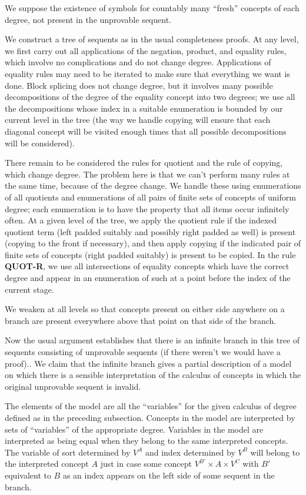 \documentclass{article}
\begin{document}
We suppose the existence of symbols for countably many ``fresh''
concepts of each degree, not present in the unprovable sequent.

We construct a tree of sequents as in the usual completeness proofs.
At any level, we first carry out all applications of the negation,
product, and equality rules, which involve no complications and do not
change degree.  Applications of equality rules may need to be iterated
to make sure that everything we want is done.  Block splicing does not
change degree, but it involves many possible decompositions of the
degree of the equality concept into two degrees; we use all the
decompositions whose index in a suitable enumeration is bounded by our
current level in the tree (the way we handle copying will ensure that
each diagonal concept will be visited enough times that all possible
decompositions will be considered).

There remain to be considered the rules for quotient and the rule of
copying, which change degree.  The problem here is that we can't
perform many rules at the same time, because of the degree change.  We
handle these using enumerations of all quotients and enumerations of
all pairs of finite sets of concepts of uniform degree; each
enumeration is to have the property that all items occur infinitely
often.  At a given level of the tree, we apply the quotient rule if
the indexed quotient term (left padded suitably and possibly right
padded as well) is present (copying to the front if necessary), and
then apply copying if the indicated pair of finite sets of concepts
(right padded suitably) is present to be copied.  In the rule {\bf
QUOT-R}, we use all intersections of equality concepts which have the
correct degree and appear in an enumeration of such at a point before
the index of the current stage.

We weaken at all levels so that concepts present on either side
anywhere on a branch are present everywhere above that point on that
side of the branch.

Now the usual argument establishes that there is an infinite branch in
this tree of sequents consisting of unprovable sequents (if there
weren't we would have a proof)..  We claim that the infinite branch
gives a partial description of a model on which there is a sensible
interpretation of the calculus of concepts in which the original
unprovable sequent is invalid.

The elements of the model are all the ``variables'' for the given
calculus of degree defined as in the preceding subsection.  Concepts
in the model are interpreted by sets of ``variables'' of the
appropriate degree.  Variables in the model are interpreted as being
equal when they belong to the same interpreted concepts.  The variable
of sort determined by $V^A$ and index determined by $V^B$ will belong
to the interpreted concept $A$ just in case some concept $V^{B'} \times
A \times V^C$ with $B'$ equivalent to $B$ as an index appears on the
left side of some sequent in the branch.
\end{document}
